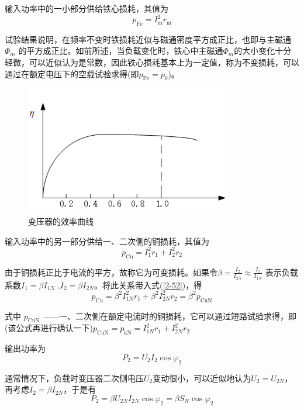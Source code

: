 \documentclass{book}
\begin{document}
输入功率中的一小部分供给铁心损耗，其值为
\[{{p}_{\text{Fe}}}=I_{\text{m}}^{2}{{r}_{\text{m}}}\]

试验结果说明，在频率不变时铁损耗近似与磁通密度平方成正比，也即与主磁通${{\Phi }_{m}}$ 的平方成正比。如前所述，当负载变化时，铁心中主磁通${{\Phi }_{m}}$的大小变化十分轻微，可以近似认为是常数，因此铁心损耗基本上为一定值，称为不变损耗，可以通过在额定电压下的空载试验求得(即${{p}_{\text{Fe}}}={{p}_{0}}$)。
\begin{figure}[H]
	\centering
	\includegraphics[width=0.80\textwidth]{3-20g.png}
	\caption{变压器的效率曲线}
	\label{fig_3.20}
\end{figure}
输入功率中的另一部分供给一、二次侧的铜损耗，其值为
\begin{equation}
{{p}_{\text{Cu}}}=I_{1}^{2}{{r}_{1}}+I_{2}^{2}{{r}_{2}}
\label{2-52}
\end{equation}

由于铜损耗正比于电流的平方，故称它为可变损耗。如果令$\beta =\frac{{{I}_{2}}}{{{I}_{2N}}}\approx \frac{{{I}_{1}}}{{{I}_{1N}}}$ 表示负载系数${{I}_{1}}=\beta {{I}_{1N}}$ ,${{I}_{2}}=\beta {{I}_{2N}}$。将此关系带入式(\ref{2-52})，得
\begin{equation}
{{p}_{\text{Cu}}}={{\beta }^{2}}I_{1N}^{2}{{r}_{1}}+{{\beta }^{2}}I_{2N}^{2}{{r}_{2}}={{\beta }^{2}}{{p}_{\text{CuN}}}
\label{2-53}
\end{equation}

式中  ${{p}_{\text{CuN}}}$ ——一、二次侧在额定电流时的铜损耗，它可以通过短路试验求得，即(该公式再进行确认一下)${{p}_{\text{CuN}}}={{p}_{\text{kN}}}=I_{1N}^{2}{{r}_{1}}+I_{2N}^{2}{{r}_{2}}$ 

输出功率为
\[{{P}_{2}}={{U}_{2}}{{I}_{2}}\cos {{\varphi }_{2}}\]

通常情况下，负载时变压器二次侧电压${{U}_{2}}$变动很小，可以近似地认为${{U}_{2}}={{U}_{2N}}$，再考虑${{I}_{2}}=\beta {{I}_{2N}}$，于是有
\begin{equation}
{{P}_{2}}=\beta {{U}_{2N}}{{I}_{2N}}\cos {{\varphi }_{2}}=\beta {{S}_{N}}\cos {{\varphi }_{2}}
\label{3-54}
\end{equation}
\end{document}
